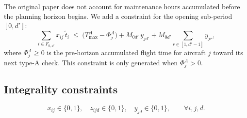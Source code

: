 The original paper does not account for maintenance hours accumulated before
the planning horizon begins.  We add a constraint for the opening sub-period
$[0, d']$:
\begin{equation}\label{eq:c13b}
  \tag{13c}
  \sum_{i \in F_{0,d'}} x_{ij}\,\tilde{t}_i
  \;\le\;
  \bigl(T^A_{\max} - \Phi^A_j\bigr)
  + M_{0d'}\, y_{jd'}
  + M_{0d'}\!\sum_{r \in [1, d'-1]} y_{jr},
\end{equation}
where $\Phi^A_j \ge 0$ is the pre-horizon accumulated flight time for aircraft
$j$ toward its next type-A check.  This constraint is only generated when
$\Phi^A_j > 0$.

\subsection{Integrality constraints}

\begin{equation}
  x_{ij} \in \{0,1\},\quad
  z_{ijd} \in \{0,1\},\quad
  y_{jd} \in \{0,1\},
  \qquad \forall i,j,d.
\end{equation}
